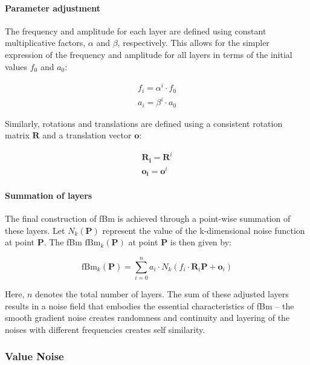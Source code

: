 \paragraph{Parameter adjustment}

The frequency and amplitude for each layer are defined using constant multiplicative factors, $\alpha$ and $\beta$, respectively. This allows for the simpler expression of the frequency and amplitude for all layers in terms of the initial values $f_0$ and $a_0$:

\begin{align}
f_i = \alpha^i \cdot f_0 \\
a_i = \beta^i \cdot a_0
\end{align}

Similarly, rotations and translations are defined using a consistent rotation matrix $\mathbf{R}$ and a translation vector $\mathbf{o}$:

\begin{align}
\mathbf{R_i} = \mathbf{R}^i \\
\mathbf{o_i} = \mathbf{o}^i
\end{align}

\paragraph{Summation of layers}

The final construction of fBm is achieved through a point-wise summation of these layers. Let $N_k(\mathbf{P})$ represent the value of the k-dimensional noise function at point $\mathbf{P}$. The fBm $\text{fBm}_k(\mathbf{P})$ at point $\mathbf{P}$ is then given by:

\begin{equation}
    \text{fBm}_k(\mathbf{P}) = \sum_{i=0}^{n} a_i \cdot N_k(f_i \cdot \mathbf{R}_i\mathbf{P} + \mathbf{o}_i)
\end{equation}

Here, $n$ denotes the total number of layers. The sum of these adjusted layers results in a noise field that embodies the essential characteristics of fBm -- the smooth gradient noise creates randomness and continuity and layering of the noises with different frequencies creates self similarity.

\subsubsection{Value Noise}
\label{value noise}


